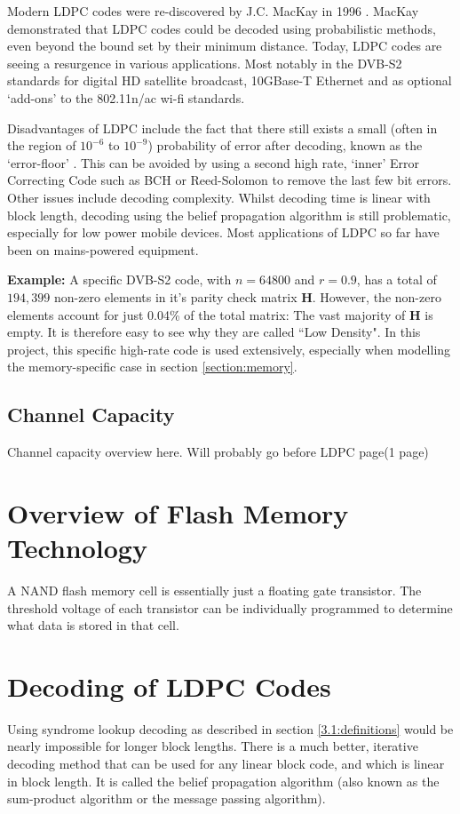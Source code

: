 \documentclass[11pt]{article}
\numberwithin{equation}{subsection}
\begin{document}
Modern LDPC codes were re-discovered by J.C. MacKay in 1996 \cite{mncisit}. MacKay demonstrated that LDPC codes could be decoded using probabilistic methods, even beyond the bound set by their minimum distance. Today, LDPC codes are seeing a resurgence in various applications. Most notably in the DVB-S2 standards for digital HD satellite broadcast, 10GBase-T Ethernet and as optional `add-ons' to the 802.11n/ac wi-fi standards.

Disadvantages of LDPC include the fact that there still exists a small (often in the region of $10^{-6}$ to $10^{-9}$) probability of error after decoding, known as the `error-floor' \cite{richardson2003error}. This can be avoided by using a second high rate, `inner' Error Correcting Code such as BCH or Reed-Solomon to remove the last few bit errors. Other issues include decoding complexity. Whilst decoding time is linear with block length, decoding using the belief propagation algorithm is still problematic, especially for low power mobile devices. Most applications of LDPC so far have been on mains-powered equipment.


\textbf{Example:}
A specific DVB-S2 code, with $n = 64800$ and $r = 0.9$, has a total of $194,399$ non-zero elements in it's parity check matrix $\mathbf{H}$. However, the non-zero elements account for just 0.04\% of the total matrix: The vast majority of $\mathbf{H}$ is empty. It is therefore easy to see why they are called ``Low Density". In this project, this specific high-rate code is used extensively, especially when modelling the memory-specific case in section \ref{section:memory}.

\subsection{Channel Capacity}

Channel capacity overview here. Will probably go before LDPC page(1 page)

\section{Overview of Flash Memory Technology} \label{section:memtech}
A NAND flash memory cell is essentially just a floating gate transistor. The threshold voltage of each transistor can be individually programmed to determine what data is stored in that cell. 

\section{Decoding of LDPC Codes} \label{decoding}
Using syndrome lookup decoding as described in section \ref{3.1:definitions} would be nearly impossible for longer block lengths. There is a much better, iterative decoding method that can be used for any linear block code, and which is linear in block length. It is called the belief propagation algorithm (also known as the sum-product algorithm or the message passing algorithm). 
\end{document}
